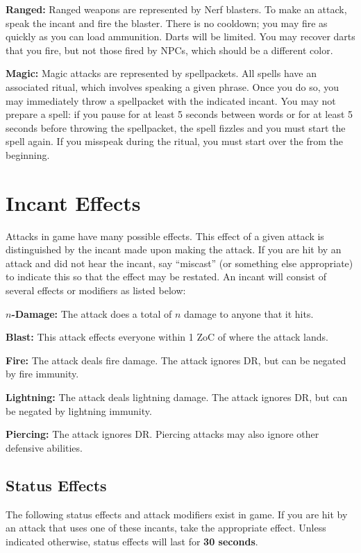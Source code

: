 \documentclass[green]{grimrock}
\begin{document}
{\bf Ranged:} Ranged weapons are represented by Nerf blasters.  To make an attack, speak the incant and fire the blaster.  There is no cooldown; you may fire as quickly as you can load ammunition.  Darts will be limited.  You may recover darts that you fire, but not those fired by NPCs, which should be a different color.

{\bf Magic:}  Magic attacks are represented by spellpackets.  All spells have an associated ritual, which involves speaking a given phrase.  Once you do so, you may immediately throw a spellpacket with the indicated incant.  You may not prepare a spell: if you pause for at least 5 seconds between words or for at least 5 seconds before throwing the spellpacket, the spell fizzles and you must start the spell again.  If you misspeak during the ritual, you must start over the from the beginning.

\section{Incant Effects}

Attacks in game have many possible effects. This effect of a given attack is distinguished by the incant made upon making the attack. If you are hit by an attack and did not hear the incant, say ``miscast'' (or something else appropriate) to indicate this so that the effect may be restated. An incant will consist of several effects or modifiers as listed below:

{\bf $n$-Damage:} The attack does a total of $n$ damage to anyone that it hits.

{\bf Blast:} This attack effects everyone within 1 ZoC of where the attack lands.

{\bf Fire:} The attack deals fire damage.  The attack ignores DR, but can be negated by fire immunity.

{\bf Lightning:} The attack deals lightning damage.  The attack ignores DR, but can be negated by lightning immunity.

{\bf Piercing:} The attack ignores DR.  Piercing attacks may also ignore other defensive abilities.


\subsection{Status Effects}

The following status effects and attack modifiers exist in game.  If you are hit by an attack that uses one of these incants, take the appropriate effect.  Unless indicated otherwise, status effects will last for {\bf 30 seconds}.
\end{document}

